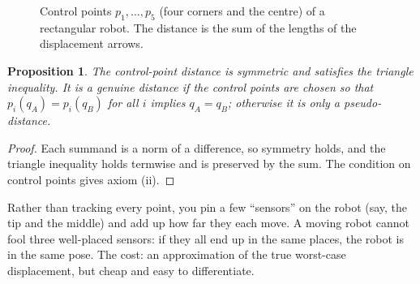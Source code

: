 \documentclass[11pt,a4paper]{article}
\newcommand{\norm}[1]{\lVert #1\rVert}
\theoremstyle{definition}
\theoremstyle{plain}
\newtheorem{proposition}[definition]{Proposition}
\begin{document}
\begin{figure}[ht]
\centering
{}
\caption{Control points $p_1,\dots,p_5$ (four corners and the centre) of a rectangular robot. The distance is the sum of the lengths of the displacement arrows.}
\end{figure}

\begin{proposition}
The control-point distance is symmetric and satisfies the triangle inequality. It is a genuine distance if the control points are chosen so that $p_i(q_A)=p_i(q_B)$ for all $i$ implies $q_A=q_B$; otherwise it is only a pseudo-distance.
\end{proposition}

\begin{proof}
Each summand is a norm of a difference, so symmetry holds, and the triangle inequality holds termwise and is preserved by the sum. The condition on control points gives axiom (ii). 
\end{proof}

\begin{intuition}
Rather than tracking every point, you pin a few ``sensors'' on the robot (say, the tip and the middle) and add up how far they each move. A moving robot cannot fool three well-placed sensors: if they all end up in the same places, the robot is in the same pose. The cost: an approximation of the true worst-case displacement, but cheap and easy to differentiate.
\end{intuition}
\end{document}
